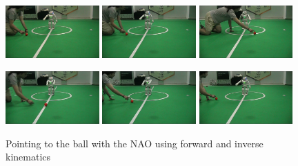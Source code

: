 \begin{figure}[!t]
\centerline{
\includegraphics[width=0.32\textwidth]{Figures/Demo1/1.png}
\includegraphics[width=0.32\textwidth]{Figures/Demo1/2.png}
\includegraphics[width=0.32\textwidth]{Figures/Demo1/3.png}
}
\vspace*{0.06cm}
\centerline{
\includegraphics[width=0.32\textwidth]{Figures/Demo1/4.png}
\includegraphics[width=0.32\textwidth]{Figures/Demo1/5.png}
\includegraphics[width=0.32\textwidth]{Figures/Demo1/6.png}
}
\caption{Pointing to the ball with the NAO using forward and inverse kinematics}
\label{demo1}
\end{figure}

